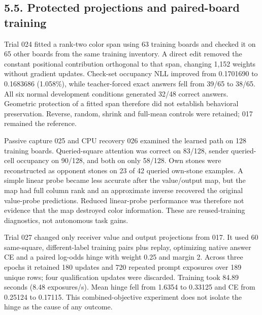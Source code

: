 \documentclass[11pt]{article}
\begin{document}
\subsection*{5.5. Protected projections and paired-board training}
Trial 024 fitted a rank-two color span using 63 training boards and checked it on 65 other boards from the same training inventory. A direct edit removed the constant positional contribution orthogonal to that span, changing 1,152 weights without gradient updates. Check-set occupancy NLL improved from 0.1701690 to 0.1683686 (1.058\%), while teacher-forced exact answers fell from 39/65 to 38/65. All six normal development conditions generated 32/48 correct answers. Geometric protection of a fitted span therefore did not establish behavioral preservation. Reverse, random, shrink and full-mean controls were retained; 017 remained the reference.

Passive capture 025 and CPU recovery 026 examined the learned path on 128 training boards. Queried-square attention was correct on 83/128, sender queried-cell occupancy on 90/128, and both on only 58/128. Own stones were reconstructed as opponent stones on 23 of 42 queried own-stone examples. A simple linear probe became less accurate after the value/output map, but the map had full column rank and an approximate inverse recovered the original value-probe predictions. Reduced linear-probe performance was therefore not evidence that the map destroyed color information. These are reused-training diagnostics, not autonomous task gains.

Trial 027 changed only receiver value and output projections from 017. It used 60 same-square, different-label training pairs plus replay, optimizing native answer CE and a paired log-odds hinge with weight 0.25 and margin 2. Across three epochs it retained 180 updates and 720 repeated prompt exposures over 189 unique rows; four qualification updates were discarded. Training took 84.89 seconds (8.48 exposures/s). Mean hinge fell from 1.6354 to 0.33125 and CE from 0.25124 to 0.17115. This combined-objective experiment does not isolate the hinge as the cause of any outcome.
\end{document}
